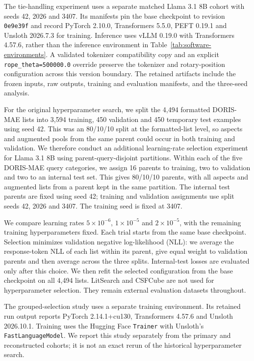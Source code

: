 \documentclass[pdflatex,sn-basic,Numbered]{sn-jnl}%
\theoremstyle{thmstyleone}%
\theoremstyle{thmstyletwo}%
\theoremstyle{thmstylethree}%
\begin{document}
The tie-handling experiment uses a separate matched Llama 3.1 8B cohort with
seeds 42, 2026 and 3407. Its manifests pin the base checkpoint to revision
\texttt{0e9e39f} and record PyTorch 2.10.0, Transformers 5.5.0, PEFT 0.19.1
and Unsloth 2026.7.3 for training. Inference uses vLLM 0.19.0 with
Transformers 4.57.6, rather than the inference environment in
Table~\ref{tab:software-environments}. A validated tokenizer compatibility copy
and an explicit \texttt{rope\_theta=500000.0} override preserve the tokenizer
and rotary-position configuration across this version boundary. The retained
artifacts include the frozen inputs, raw outputs, training and evaluation
manifests, and the three-seed analysis.

For the original hyperparameter search, we split the 4,494 formatted DORIS-MAE
lists into
3,594 training, 450 validation and 450 temporary test examples using seed 42.
This was an 80/10/10 split at the formatted-list level, so aspects and augmented
pools from the same parent could occur in both training and validation. We
therefore conduct an additional learning-rate selection experiment for Llama
3.1 8B using parent-query-disjoint partitions. Within each of the five DORIS-MAE
query categories, we assign 16 parents to training, two to validation and two
to an internal test set. This gives 80/10/10 parents, with all aspects and
augmented lists from a parent kept in the same partition. The internal test
parents are fixed using seed 42; training and validation assignments use split
seeds 42, 2026 and 3407. The training seed is fixed at 3407.

We compare learning rates $5\times10^{-6}$, $1\times10^{-5}$ and
$2\times10^{-5}$, with the remaining training hyperparameters fixed. Each trial
starts from the same base checkpoint. Selection minimizes validation
negative log-likelihood (NLL): we average the response-token NLL of each list
within its parent, give equal weight to validation parents and then average
across the three splits. Internal-test losses are evaluated only after this
choice. We then refit the selected configuration from the base checkpoint on
all 4,494 lists. LitSearch and CSFCube are not used for hyperparameter selection.
They remain external evaluation datasets throughout.

The grouped-selection study uses a separate training environment. Its retained
run output reports PyTorch 2.14.1+cu130, Transformers 4.57.6 and Unsloth
2026.10.1. Training uses the Hugging Face \texttt{Trainer} with
Unsloth's \texttt{FastLanguageModel}. We report this study separately from the
primary and reconstructed cohorts; it is not an exact rerun of the historical
hyperparameter search.
\end{document}
